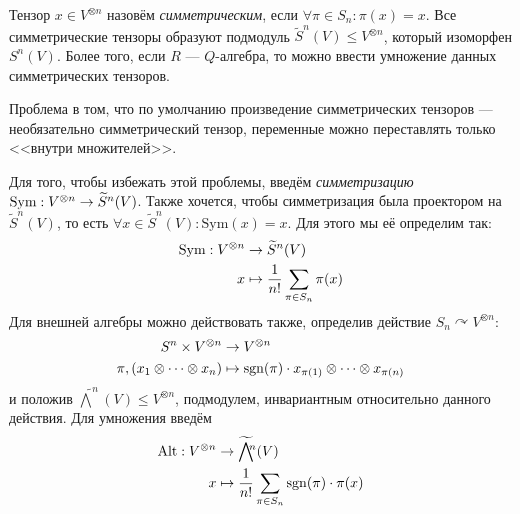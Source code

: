 Тензор $x \in V^{\otimes n}$ назовём \textit{симметрическим}, если $\forall \pi \in S_n: \pi(x) = x$.
Все симметрические тензоры образуют подмодуль $\tilde{S}^n(V) \le V^{\otimes n}$, который изоморфен $S^n(V)$.
Более того, если $R$ --- $Q$-алгебра, то можно ввести умножение данных симметрических тензоров.

Проблема в том, что по умолчанию произведение симметрических тензоров --- необязательно симметрический тензор, переменные можно переставлять только <<внутри множителей>>.

Для того, чтобы избежать этой проблемы, введём \textit{симметризацию} $\text{Sym}: V^{\otimes n} \rightarrow \widetilde{S}^n(V)$.
Также хочется, чтобы симметризация была проектором на $\tilde{S}^n(V)$, то есть $\forall x \in \tilde{S}^n(V): \text{Sym}(x) = x$.
Для этого мы её определим так: \begin{align*}
                                   \text{Sym}:V^{\otimes n} &\rightarrow \widetilde{S}^n(V)\\x &\mapsto \frac{1}{n!}\sum\limits_{\pi \in S_n}\pi(x)
\end{align*}
\ok
Для внешней алгебры можно действовать также, определив действие $S_n \curvearrowright V^{\otimes n}$: \begin{align*}
                                                                                                          S^n \times V^{\otimes n}&\rightarrow V^{\otimes n}\\\pi, (x_1 \otimes \dots \otimes x_n) &\mapsto \operatorname{sgn}(\pi) \cdot x_{\pi(1)} \otimes \dots \otimes x_{\pi(n)}
\end{align*}и положив $\tilde{\bigwedge}^n(V) \le V^{\otimes n}$, подмодулем, инвариантным относительно данного действия.
Для умножения введём \begin{align*}
                         \text{Alt}: V^{\otimes n} &\rightarrow \widetilde{\bigwedge}\!\!{}^n(V)\\x &\mapsto \frac{1}{n!}\sum\limits_{\pi \in S_n}\operatorname{sgn}(\pi)\cdot\pi(x)
\end{align*}

